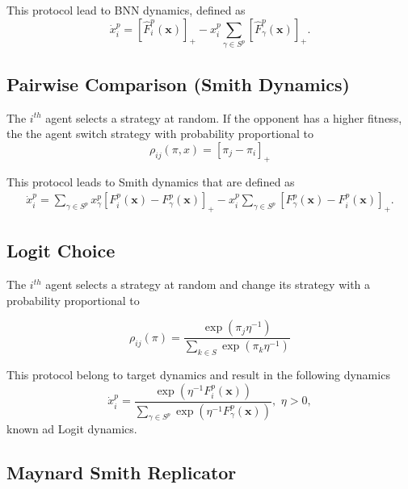 \documentclass[a4paper,10pt]{article}
\def\th{^{th}}
\newcommand{\bs}[1]{\boldsymbol{#1}}
\begin{document}
This protocol lead to BNN dynamics, defined as 
\begin{equation}\label{eq:bnn}
 \dot{x}_i^p = \left[ \hat{F}_i^p \left( \bs{x} \right) \right]_+ - x_i^p  \sum_{\gamma \in S^p} \left[ \hat{F}_\gamma^p \left( \bs{x} \right) \right]_+.
\end{equation}

\subsection{Pairwise Comparison (Smith Dynamics)}

The $i\th$ agent selects a strategy at random. If the opponent has a higher fitness, the the agent switch strategy with probability proportional to
\begin{equation}
\rho_{ij}(\pi, x) = \left[ \pi_j - \pi_i \right]_+
\end{equation}

This protocol leads to Smith dynamics that are defined as 
%
\begin{multline} 
\dot{x}_i^p  = \sum_{\gamma \in S^p} x_\gamma^p  \left[ F_i^p \left( \bs{x} \right) - F_\gamma^p \left( \bs{x} \right) \right]_+ 
- x_i^p  \sum_{\gamma \in S^p} \left[ F_\gamma^p ( \bs{x}) - F_i^p( \bs{x} ) \right]_+.
\label{eq:smith}
\end{multline}



\subsection{Logit Choice}

The $i\th$ agent selects a strategy at random and change its strategy with a probability proportional to 

\begin{equation}
\rho_{ij}(\pi) = \frac{ \exp(\pi_j \eta^{-1} ) }{ \sum_{k \in S} \exp(\pi_k \eta^{-1} ) }
\end{equation}

This protocol belong to target dynamics and result in the following dynamics
\begin{equation}\label{eq:logit}
 \dot{x}_i^p = \frac{ \exp\left(\eta^{-1} F_i^p (\bs{x}) \right) }{ \sum_{\gamma \in S^p} \exp\left(\eta^{-1} F_\gamma^p (\bs{x}) \right) }, \, \, \eta>0,
\end{equation}
known ad Logit dynamics. 



\subsection{Maynard Smith Replicator}
\end{document}
